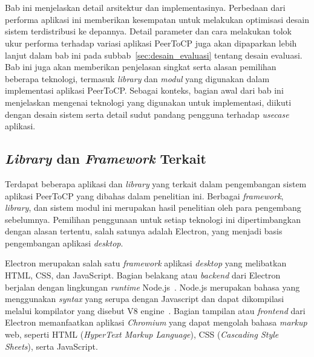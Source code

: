 \chapter{\babEmpat}
\label{bab:4}

Bab ini menjelaskan detail arsitektur dan implementasinya. Perbedaan dari performa aplikasi ini memberikan kesempatan untuk melakukan optimisasi desain sistem terdistribusi ke depannya. Detail parameter dan cara melakukan tolok ukur performa terhadap variasi aplikasi PeerToCP juga akan dipaparkan lebih lanjut dalam bab ini pada subbab~\ref{sec:desain_evaluasi} tentang desain evaluasi. Bab ini juga akan memberikan penjelasan singkat serta alasan pemilihan beberapa teknologi, termasuk \textit{library} dan \textit{modul} yang digunakan dalam implementasi aplikasi PeerToCP. Sebagai konteks, bagian awal dari bab ini menjelaskan mengenai teknologi yang digunakan untuk implementasi, diikuti dengan desain sistem serta detail sudut pandang pengguna terhadap \textit{usecase} aplikasi.

\section{\textit{Library} dan \textit{Framework} Terkait}

Terdapat beberapa aplikasi dan \textit{library} yang terkait dalam pengembangan sistem aplikasi PeerToCP yang dibahas dalam penelitian ini. Berbagai \textit{framework}, \textit{library}, dan sistem modul ini merupakan hasil penelitian oleh para pengembang sebelumnya. Pemilihan penggunaan untuk setiap teknologi ini dipertimbangkan dengan alasan tertentu, salah satunya adalah Electron, yang menjadi basis pengembangan aplikasi \textit{desktop}.

Electron merupakan salah satu \textit{framework} aplikasi \textit{desktop} yang melibatkan HTML, CSS, dan JavaScript. Bagian belakang atau \textit{backend} dari Electron berjalan dengan lingkungan \textit{runtime} Node.js~\citep{kredpattanakul2018transforming, miglanielectron}. Node.js merupakan bahasa yang menggunakan \textit{syntax} yang serupa dengan Javascript dan dapat dikompilasi melalui kompilator yang disebut V8 engine~\citep{tilkov2010node}. Bagian tampilan atau \textit{frontend} dari Electron memanfaatkan aplikasi \textit{Chromium} yang dapat mengolah bahasa \textit{markup} web, seperti HTML (\textit{HyperText Markup Language}), CSS (\textit{Cascading Style Sheets}), serta JavaScript.

